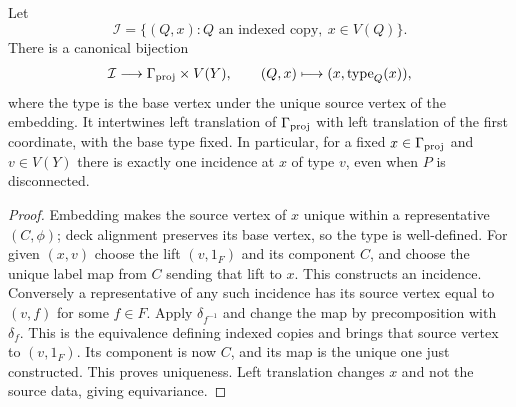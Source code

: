 \begin{proposition}
\label{geo:incidences}
Let
\[
 \mathcal I=\{(Q,x):Q\text{ an indexed copy},\ x\in V(Q)\}.
\]
There is a canonical bijection
\begin{equation}
 \mathcal I\longrightarrow\Gamma_{\mathrm{proj}}\times V(Y),\qquad
 (Q,x)\longmapsto(x,\operatorname{type}_Q(x)),
 \label{geo:incidence-bijection}
\end{equation}
where the type is the base vertex under the unique source vertex of the
embedding.  It intertwines left translation of $\Gamma_{\mathrm{proj}}$ with left
translation of the first coordinate, with the base type fixed.
In particular, for a fixed $x\in\Gamma_{\mathrm{proj}}$ and $v\in V(Y)$ there is exactly
one incidence at $x$ of type $v$, even when $P$ is disconnected.
\end{proposition}

\begin{proof}
Embedding makes the source vertex of $x$ unique within a representative
$(C,\phi)$; deck alignment preserves its base vertex, so the type is
well-defined.  For given $(x,v)$ choose the lift $(v,1_F)$ and its component
$C$, and choose the unique label map from $C$ sending that lift to $x$.
This constructs an incidence.  Conversely a representative of any such
incidence has its source vertex equal to $(v,f)$ for some $f\in F$.
Apply $\delta_{f^{-1}}$ and change the map by precomposition with
$\delta_f$.  This is the equivalence defining indexed copies and brings
that source vertex to $(v,1_F)$.  Its component is now $C$, and its map
is the unique one just constructed.  This proves uniqueness.  Left
translation changes $x$ and not the source data, giving equivariance.
\end{proof}

